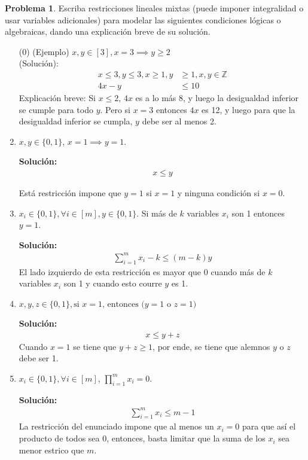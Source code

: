 \documentclass{article}
\newcommand{\ZZ}{\mathbb Z}
\theoremstyle{plain}
\theoremstyle{definition}
\newtheorem{prob}[teo]{Problema}
\theoremstyle{Azul}
\begin{document}
\begin{prob}
Escriba restricciones lineales mixtas (puede imponer integralidad o usar variables adicionales) para modelar las siguientes condiciones lógicas o algebraicas, dando una explicación breve de su solución.


\begin{enumerate}[(1)]
\item[(0)] (Ejemplo)  $x, y\in [3], x=3 \implies y\ge 2$\\
(Solución):   \begin{align*}
x\leq 3, y\leq 3, x\ge 1, y&\ge 1, x, y\in \ZZ\\
4x-y&\leq 10
\end{align*}
Explicación breve: Si $x\leq 2$, $4x$ es a lo más 8, y luego la desigualdad inferior se cumple para todo $y$.
Pero si $x=3$ entonces $4x$ es 12, y luego para que la desigualdad inferior se cumpla, $y$ debe ser al menos 2.

\item $x, y\in \{0,1\}$, $x=1 \implies y=1$.

\textbf{Solución:}\\
\begin{align*}
	x\leq y
\end{align*}

Está restricción impone que $y=1$ si $x=1$ y ninguna condición si $x=0$.
\item $x_i \in \{0,1\}, \forall i\in [m], y\in \{0,1\}$. Si más de $k$ variables $x_i$ son 1 entonces $y=1$.

\textbf{Solución:}\\
\begin{align*}
	\sum_{i=1}^{m}x_{i}-k\leq (m-k)y
\end{align*}
El lado izquierdo de esta restricción es mayor que 0 cuando más de $k$ variables $x_{i}$ son 1 y cuando esto courre $y$ es 1.

\item $x, y, z\in \{0,1\}, \text{si $x=1$, entonces ($y=1$ o $z=1$)}$

\textbf{Solución:}\\
\begin{align*}
	x\leq y+z
\end{align*}
Cuando $x=1$ se tiene que $y+z\geq1$, por ende, se tiene que alemnos $y$ o $z$ debe ser 1.

\item $x_i \in \{0,1\}, \forall i\in [m]$, $\prod_{i=1}^m x_i = 0$.

\textbf{Solución:}\\
\begin{align*}
	\sum_{i=1}^{m}x_{i}\leq m-1
\end{align*}
La restricción del enunciado impone que al menos un $x_i=0$ para que así el producto de todos sea 0, entonces, basta limitar que la suma de los $x_{i}$ sea menor estrico que $m$.


\end{enumerate}
\end{prob}
\end{document}
